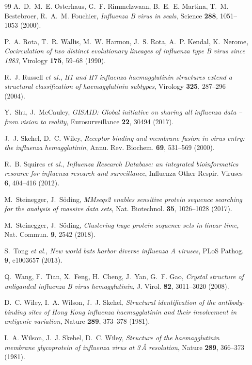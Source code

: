 \documentclass[11pt,a4paper]{article}
\begin{document}
\begin{thebibliography}{99}
 A.~D.~M.~E. Osterhaus, G.~F. Rimmelzwaan,
  B.~E.~E. Martina, T.~M. Bestebroer, R.~A.~M. Fouchier,
  \emph{Influenza B virus in seals}, Science \textbf{288}, 1051--1053 (2000).

 P.~A. Rota, T.~R. Wallis, M.~W. Harmon, J.~S. Rota,
  A.~P. Kendal, K.~Nerome,
  \emph{Cocirculation of two distinct evolutionary lineages of influenza type B
  virus since 1983}, Virology \textbf{175}, 59--68 (1990).

 R.~J. Russell \emph{et al.},
  \emph{H1 and H7 influenza haemagglutinin structures extend a structural
  classification of haemagglutinin subtypes}, Virology \textbf{325}, 287--296
  (2004).

 Y.~Shu, J.~McCauley,
  \emph{GISAID: Global initiative on sharing all influenza data -- from vision
  to reality}, Eurosurveillance \textbf{22}, 30494 (2017).

 J.~J. Skehel, D.~C. Wiley,
  \emph{Receptor binding and membrane fusion in virus entry: the influenza
  hemagglutinin}, Annu. Rev. Biochem. \textbf{69}, 531--569 (2000).

 R.~B. Squires \emph{et al.},
  \emph{Influenza Research Database: an integrated bioinformatics resource for
  influenza research and surveillance}, Influenza Other Respir. Viruses
  \textbf{6}, 404--416 (2012).

 M.~Steinegger, J.~S\"oding,
  \emph{MMseqs2 enables sensitive protein sequence searching for the analysis of
  massive data sets}, Nat. Biotechnol. \textbf{35}, 1026--1028 (2017).

 M.~Steinegger, J.~S\"oding,
  \emph{Clustering huge protein sequence sets in linear time}, Nat. Commun.
  \textbf{9}, 2542 (2018).

 S.~Tong \emph{et al.},
  \emph{New world bats harbor diverse influenza A viruses}, PLoS Pathog.
  \textbf{9}, e1003657 (2013).

 Q.~Wang, F.~Tian, X.~Feng, H.~Cheng, J.~Yan, G.~F. Gao,
  \emph{Crystal structure of unliganded influenza B virus hemagglutinin},
  J. Virol. \textbf{82}, 3011--3020 (2008).

 D.~C. Wiley, I.~A. Wilson, J.~J. Skehel,
  \emph{Structural identification of the antibody-binding sites of Hong Kong
  influenza haemagglutinin and their involvement in antigenic variation},
  Nature \textbf{289}, 373--378 (1981).

 I.~A. Wilson, J.~J. Skehel, D.~C. Wiley,
  \emph{Structure of the haemagglutinin membrane glycoprotein of influenza virus
  at 3\,\AA{} resolution}, Nature \textbf{289}, 366--373 (1981).

\end{thebibliography}
\end{document}
